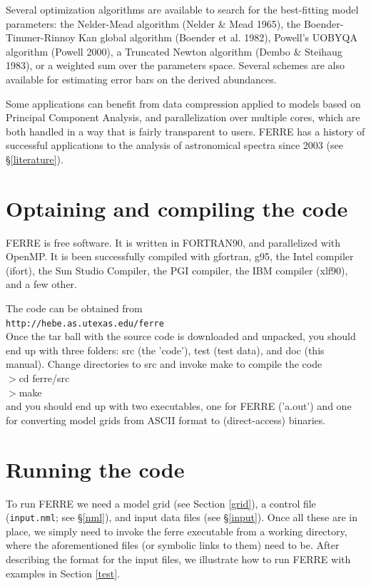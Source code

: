 \documentclass[12pt]{article}
\begin{document}
Several optimization algorithms are available to search for the 
best-fitting model parameters: 
the Nelder-Mead algorithm (Nelder \& Mead 1965), 
the  Boender-Timmer-Rinnoy Kan global algorithm (Boender et al. 1982), 
Powell's UOBYQA algorithm (Powell 2000), 
a Truncated Newton algorithm (Dembo \& Steihaug 1983), 
or a weighted sum over the parameters space. Several schemes are also available 
for estimating error bars on the derived abundances. 

Some applications can benefit from data compression applied to models based on 
Principal Component Analysis, and parallelization
over multiple cores, which are both handled in a way that is
fairly transparent to users.
FERRE has a history of successful applications to the analysis of
astronomical spectra since 2003 (see \S \ref{literature}).

\section{Optaining and compiling the code}
\label{compiling}

FERRE is free software. It is written in FORTRAN90, and parallelized
with OpenMP. It is been successfully compiled with gfortran, g95, 
the Intel compiler (ifort), the  Sun Studio Compiler, the PGI compiler, 
the IBM compiler (xlf90), and a few other.

The code can be obtained from \\
{\tt http://hebe.as.utexas.edu/ferre} \\
Once the tar ball with the source code is downloaded and unpacked, 
you should end up with three
folders: src (the 'code'), test (test data), 
and doc (this manual). Change directories to src and invoke
make to compile the code  \\
$>$cd  ferre/src \\
$>$make  \\
\noindent and you should end up with two executables, 
one for FERRE ('a.out') and one for  converting
model grids from ASCII format to (direct-access) binaries.

\section{Running the code}
\label{running}

To run FERRE we need a model grid (see Section \ref{grid}), a control
file ({\tt input.nml}; see \S \ref{nml}), 
and input data files (see \S \ref{input}).
Once all these are in place, we simply need to invoke the ferre executable
from a working directory, where the aforementioned files 
(or symbolic links to them) need to be. After describing the format 
for the input files, we illustrate how to run FERRE with examples
in Section \ref{test}.
\end{document}
